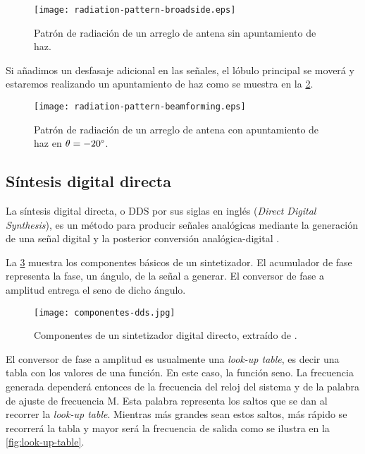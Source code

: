 \documentclass{article}
\newenvironment{standalone}{\begin{preview}}{\end{preview}}
\begin{document}
\begin{standalone}
  \begin{figure}[!htbp]
    \centering
    \texttt{[image: radiation-pattern-broadside.eps]}
    \caption{Patrón de radiación de un arreglo de antena sin apuntamiento de haz.}
    \label{fig:patron-radiacion-sin-apuntamiento}
  \end{figure}

  Si añadimos un desfasaje adicional en las señales, el lóbulo principal se moverá y estaremos realizando un apuntamiento de haz como se muestra en la \cref{fig:patron-radiacion-con-apuntamiento}.

  \begin{figure}[!htbp]
    \centering
    \texttt{[image: radiation-pattern-beamforming.eps]}
    \caption{Patrón de radiación de un arreglo de antena con apuntamiento de haz en $\theta = -20\degree$.}
    \label{fig:patron-radiacion-con-apuntamiento}
  \end{figure}

  \subsection{Síntesis digital directa} \label{subsec:dds}

  La síntesis digital directa, o DDS por sus siglas en inglés (\textit{Direct Digital Synthesis}), es un método para producir señales analógicas mediante la generación de una señal digital y la posterior conversión analógica-digital \cite{murphy2004}.

  La \cref{fig:componentes-dds} muestra los componentes básicos de un sintetizador.
  El acumulador de fase representa la fase, un ángulo, de la señal a generar.
  El conversor de fase a amplitud entrega el seno de dicho ángulo.

  \begin{figure}[!htbp]
    \centering
    \texttt{[image: componentes-dds.jpg]}
    \caption{Componentes de un sintetizador digital directo, extraído de \cite{murphy2004}.}
    \label{fig:componentes-dds}
  \end{figure}

  El conversor de fase a amplitud es usualmente una \textit{look-up table}, es decir una tabla con los valores de una función.
  En este caso, la función seno.
  La frecuencia generada dependerá entonces de la frecuencia del reloj del sistema y de la palabra de ajuste de frecuencia M.
  Esta palabra representa los saltos que se dan al recorrer la \textit{look-up table}.
  Mientras más grandes sean estos saltos, más rápido se recorrerá la tabla y mayor será la frecuencia de salida como se ilustra en la \cref{fig:look-up-table}.


\end{standalone}
\end{document}
